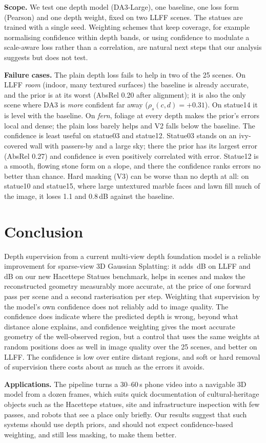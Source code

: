 \textbf{Scope.} We test one depth model (DA3-Large), one baseline, one loss form (Pearson) and one depth weight, fixed on two LLFF scenes. The statues are trained with a single seed. Weighting schemes that keep coverage, for example normalising confidence within depth bands, or using confidence to modulate a scale-aware loss rather than a correlation, are natural next steps that our analysis suggests but does not test.

\textbf{Failure cases.} The plain depth loss fails to help in two of the 25 scenes. On LLFF \emph{room} (indoor, many textured surfaces) the baseline is already accurate, and the prior is at its worst (AbsRel 0.20 after alignment); it is also the only scene where DA3 is \emph{more} confident far away ($\rho_s(c,d)=+0.31$). On statue14 it is level with the baseline. On \emph{fern}, foliage at every depth makes the prior's errors local and dense; the plain loss barely helps and V2 falls below the baseline. The confidence is least useful on statue03 and statue12. Statue03 stands on an ivy-covered wall with passers-by and a large sky; there the prior has its largest error (AbsRel 0.27) and confidence is even positively correlated with error. Statue12 is a smooth, flowing stone form on a slope, and there the confidence ranks errors no better than chance. Hard masking (V3) can be worse than no depth at all: on statue10 and statue15, where large untextured marble faces and lawn fill much of the image, it loses 1.1 and 0.8\,dB against the baseline.

\section{Conclusion}
Depth supervision from a current multi-view depth foundation model is a reliable improvement for sparse-view 3D Gaussian Splatting: it adds \LLFFVoneminusVzerodpsnr{}\,dB on LLFF and \StatuesVoneminusVzerodpsnr{}\,dB on our new Hacettepe Statues benchmark, helps in \BothVoneminusVzerowins{} scenes and makes the reconstructed geometry measurably more accurate, at the price of one forward pass per scene and a second rasterisation per step. Weighting that supervision by the model's own confidence does not reliably add to image quality. The confidence does indicate where the predicted depth is wrong, beyond what distance alone explains, and confidence weighting gives the most accurate geometry of the well-observed region, but a control that uses the same weights at random positions does as well in image quality over the 25 scenes, and better on LLFF. The confidence is low over entire distant regions, and soft or hard removal of supervision there costs about as much as the errors it avoids.

\textbf{Applications.} The pipeline turns a 30--60\,s phone video into a navigable 3D model from a dozen frames, which suits quick documentation of cultural-heritage objects such as the Hacettepe statues, site and infrastructure inspection with few passes, and robots that see a place only briefly. Our results suggest that such systems should use depth priors, and should not expect confidence-based weighting, and still less masking, to make them better.
